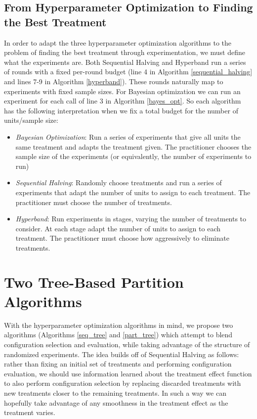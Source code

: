 \documentclass[11pt]{article}
\begin{document}
\subsection{From Hyperparameter Optimization to Finding the Best Treatment}
In order to adapt the three hyperparameter optimization algorithms to the problem of finding the best treatment through experimentation, we must define what the experiments are. Both Sequential Halving and Hyperband run a series of rounds with a fixed per-round budget (line 4 in Algorithm \ref{sequential_halving} and lines 7-9 in Algorithm \ref{hyperband}). These rounds naturally map to experiments with fixed sample sizes. For Bayesian optimization we can run an experiment for each call of line 3 in Algorithm \ref{bayes_opt}. So each algorithm has the following interpretation when we fix a total budget for the number of units/sample size:
\begin{itemize}
\item {\it Bayesian Optimization}: Run a series of experiments that give all units the same treatment and adapts the treatment given. The practitioner chooses the sample size of the experiments (or equivalently, the number of experiments to run)
\item {\it Sequential Halving}: Randomly choose treatments and run a series of experiments that adapt the number of units to assign to each treatment. The practitioner must choose the number of treatments.
\item {\it Hyperband}: Run experiments in stages, varying the number of treatments to consider. At each stage adapt the number of units to assign to each treatment. The practitioner must choose how aggressively to eliminate treatments.
\end{itemize}


\section{Two Tree-Based Partition Algorithms}
With the hyperparameter optimization algorithms in mind, we propose two algorithms (Algorithms \ref{seq_tree} and \ref{part_tree}) which attempt to blend configuration selection and evaluation, while taking advantage of the structure of randomized experiments. The idea builds off of Sequential Halving as follows: rather than fixing an initial set of treatments and performing configuration evaluation, we should use information learned about the treatment effect function to also perform configuration selection by replacing discarded treatments with new treatments closer to the remaining treatments. In such a way we can hopefully take advantage of any smoothness in the treatment effect as the treatment varies.
\end{document}
